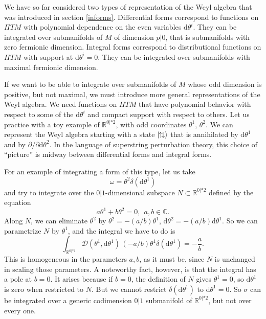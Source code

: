 \documentclass[11pt,a4paper]{article}
\def\D{{\mathcal D}}
\def\d{{\mathrm d}}
\def\R{{\mathbb R}}
\def\C{{\mathbb C}}
\def\D{{\mathcal D}}
\def\Pi{\varPi}
\begin{document}
We have so far considered two types of representation of the Weyl algebra that was introduced in section \ref{informs}.
Differential forms correspond to functions on ${\Pi} TM$ with polynomial dependence on the even variables $\d\theta^i$.
They can be integrated over submanifolds of $M$ of dimension $p|0$, that is submanifolds with zero fermionic
dimension. Integral forms correspond to distributional functions on ${\Pi} TM$ with support at $\d\theta^i=0$.
They can be integrated over submanifolds with maximal fermionic dimension. 

If we want to be able to integrate over submanifolds of $M$ whose odd dimension is positive, but not maximal, we must introduce
more general representations of the Weyl algebra.  We need functions on ${\Pi} TM$ that have polynomial behavior with respect to some
of the $\d\theta^i$ and compact support with respect to others.  Let us practice with a toy example of $\R^{0|*2}$, with odd coordinates
$\theta^1$, $\theta^2$.  We can represent the Weyl algebra starting with a state $|\negthinspace\negthinspace\uparrow\negthinspace\downarrow\rangle$
that is annihilated by $\d\theta^1$ and by $\partial/\partial\d \theta^2$.  In the language of superstring perturbation theory, this choice of
``picture'' is midway between differential forms and integral forms.  

For an example of integrating a form of this type, let us take
\begin{equation}\label{guf}\omega=\theta^2\delta(\d\theta^1) \end{equation}
and try to integrate over the $0|1$-dimensional subspace $N\subset\R^{0|*2}$ defined by the equation
\begin{equation}\label{enofo} a\theta^1+b\theta^2=0,~~a,b\in\C.\end{equation}
Along $N$, we can eliminate  $\theta^2$ by $\theta^2=-(a/b)\theta^1$, $\d\theta^2=-(a/b)\d\theta^1$.  So we can parametrize
$N$ by $\theta^1$, and the integral we have to do is
\begin{equation}\label{zub}  \int_{\R^{0|*1}}\D(\theta^1,\d\theta^1)\,(-a/b)\theta^1\delta(\d\theta^1)=-\frac{a}{b}.\end{equation}
This is homogeneous in the parameters $a,b$, as it must be, since $N$ is unchanged in scaling those parameters.  
A noteworthy fact, however, is that the integral has a pole at $b=0$.  It arises because if $b=0$, the definition
of $N$ gives $\theta^1=0$, so $\d\theta^1$ is zero when restricted to $N$.  But we cannot restrict $\delta(\d\theta^1)$ to $\d\theta^1=0$.
So $\sigma$ can be integrated over a generic codimension $0|1$ submanifold of $\R^{0|*2}$, but not over every one.
\end{document}
